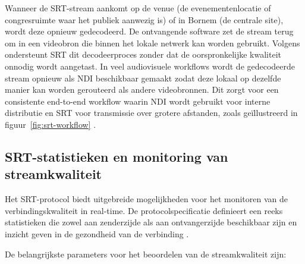 Wanneer de SRT-stream aankomt op de venue (de evenementenlocatie of congresruimte waar het publiek aanwezig is) of in Bornem (de centrale site), wordt deze opnieuw gedecodeerd. De ontvangende software zet de stream terug om in een videobron die binnen het lokale netwerk kan worden gebruikt. Volgens \textcite{Haivision2023} ondersteunt SRT dit decodeerproces zonder dat de oorspronkelijke kwaliteit onnodig wordt aangetast. In veel audiovisuele workflows wordt de gedecodeerde stream opnieuw als NDI beschikbaar gemaakt zodat deze lokaal op dezelfde manier kan worden gerouteerd als andere videobronnen. Dit zorgt voor een consistente end-to-end workflow waarin NDI wordt gebruikt voor interne distributie en SRT voor transmissie over grotere afstanden, zoals geïllustreerd in figuur~\ref{fig:srt-workflow} \autocite{VanRenterghem2025}.

\subsection{SRT-statistieken en monitoring van streamkwaliteit}

Het SRT-protocol biedt uitgebreide mogelijkheden voor het monitoren van de verbindingskwaliteit in real-time. De protocolspecificatie definieert een reeks statistieken die zowel aan zenderzijde als aan ontvangerzijde beschikbaar zijn en inzicht geven in de gezondheid van de verbinding \autocite{SRTAlliance2024}.

De belangrijkste parameters voor het beoordelen van de streamkwaliteit zijn:

